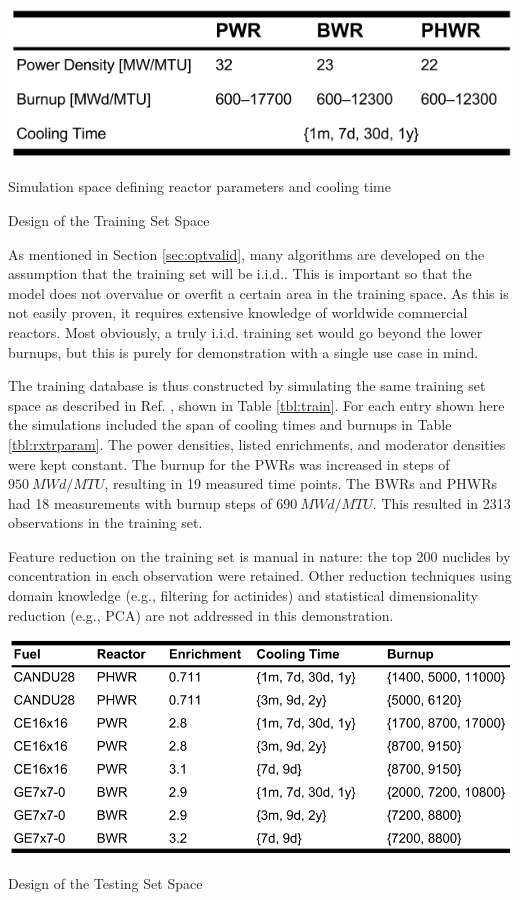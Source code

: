 \begin{table}[!hp]
  \begin{subtable}{\linewidth}
    \centering
    \includegraphics[width=0.7\linewidth]{./chapters/demo_method/TrainData2.png}
    \caption{Simulation space defining reactor parameters and cooling time}
    \label{tbl:rxtrparam}
  \end{subtable}%
  \caption{Design of the Training Set Space}
  \label{tbl:train}
\end{table}

As mentioned in Section \ref{sec:optvalid}, many algorithms are developed on
the assumption that the training set will be \acrfull{i.i.d.}. This is
important so that the model does not overvalue or overfit a certain area in the
training space. As this is not easily proven, it requires extensive knowledge
of worldwide commercial reactors. Most obviously, a truly \gls{i.i.d.} training
set would go beyond the lower burnups, but this is purely for demonstration
with a single use case in mind.  

The training database is thus constructed by simulating the same training set
space as described in Ref.  \cite{dayman_feasibility_2013}, shown in Table
\ref{tbl:train}. For each entry shown here the simulations included the span of
cooling times and burnups in Table \ref{tbl:rxtrparam}. The power densities,
listed enrichments, and moderator densities were kept constant. The burnup for
the \glspl{PWR} was increased in steps of $950\ MWd/MTU$, resulting in 19
measured time points. The \glspl{BWR} and \glspl{PHWR} had 18 measurements with
burnup steps of $690\ MWd/MTU$.  This resulted in 2313 observations in the
training set.

Feature reduction on the training set is manual in nature: the top 200 nuclides
by concentration in each observation were retained. Other reduction techniques
using domain knowledge (e.g., filtering for actinides) and statistical
dimensionality reduction (e.g., \gls{PCA}) are not addressed in this
demonstration.

\begin{table}[!hbt]
  \centering
  \includegraphics[width=0.95\linewidth]{./chapters/demo_method/TestData.png}
  \caption{Design of the Testing Set Space}
  \label{tbl:test}
\end{table}

